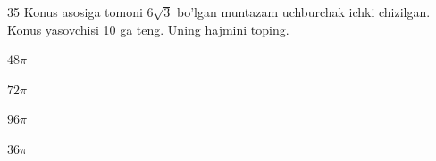 \documentclass[14pt]{article}
\begin{document}
\begin{questionbox}{35}
    Konus asosiga tomoni \(6\sqrt{3}\) bo'lgan muntazam uchburchak ichki chizilgan. Konus yasovchisi 10 ga teng. Uning hajmini toping.
    \begin{options}
        \item \(48\pi\)
        \item \(72\pi\)
        \item \(96\pi\)
        \item \(36\pi\)
    \end{options}
\end{questionbox}
\end{document}
